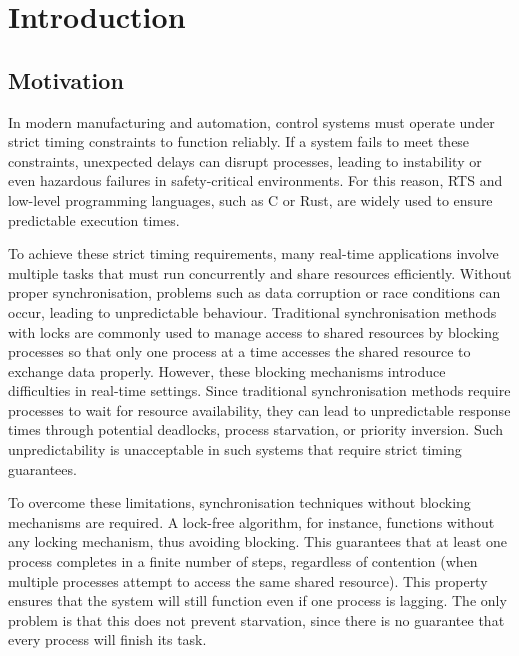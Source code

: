 \chapter{Introduction}\label{ch:introduction}

\section{Motivation}\label{sec:motivation}

In modern manufacturing and automation, control systems must operate under strict timing constraints to function reliably. If a system fails to meet these constraints, unexpected delays can disrupt processes, leading to instability or even hazardous failures in safety-critical environments. For this reason, \ac{RTS} and low-level programming languages, such as C or Rust, are widely used to ensure predictable execution times.

To achieve these strict timing requirements, many real-time applications involve multiple tasks that must run concurrently and share resources efficiently. Without proper synchronisation, problems such as data corruption or race conditions can occur, leading to unpredictable behaviour. Traditional synchronisation methods with locks are commonly used to manage access to shared resources by blocking processes so that only one process at a time accesses the shared resource to exchange data properly. However, these blocking mechanisms introduce difficulties in real-time settings. Since traditional synchronisation methods require processes to wait for resource availability, they can lead to unpredictable response times through potential deadlocks, process starvation, or priority inversion. Such unpredictability is unacceptable in such systems that require strict timing guarantees. \cite{herlihy1991wait, brandenburg2019multiprocessorrealtimelockingprotocols, kode2024analysisSynchronization}

To overcome these limitations, synchronisation techniques without blocking mechanisms are required. A lock-free algorithm, for instance, functions without any locking mechanism, thus avoiding blocking. This guarantees that at least one process completes in a finite number of steps, regardless of contention (when multiple processes attempt to access the same shared resource). This property ensures that the system will still function even if one process is lagging. The only problem is that this does not prevent starvation, since there is no guarantee that every process will finish its task. \cite{kogan2012methodology}


